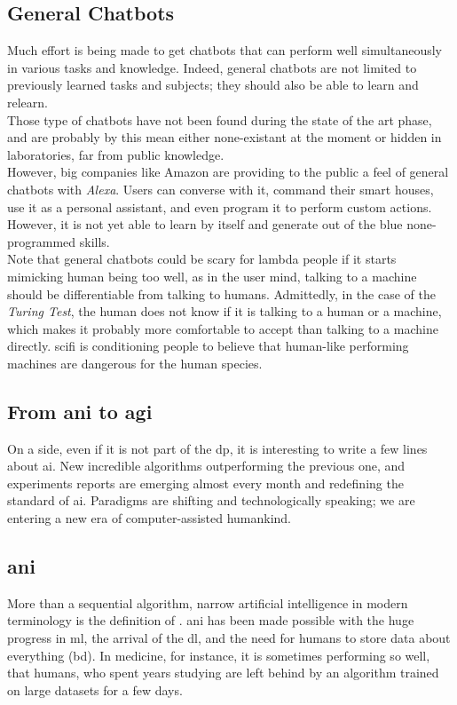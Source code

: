 \subsection{General Chatbots}
\label{sota:chatbots-general}
Much effort is being made to get chatbots that can perform well simultaneously in various tasks and knowledge. Indeed, general chatbots are not limited to previously learned tasks and subjects; they should also be able to learn and relearn.\\

Those type of chatbots have not been found during the state of the art phase, and are probably by this mean either none-existant at the moment or hidden in laboratories, far from public knowledge. \\

However, big companies like Amazon are providing to the public a feel of general chatbots with \textit{Alexa}\cite{chatbot:alexa}. Users can converse with it, command their smart houses, use it as a personal assistant, and even program it to perform custom actions. However, it is not yet able to learn by itself and generate out of the blue none-programmed skills.\\

Note that general chatbots could be scary for lambda people if it starts mimicking human being too well, as in the user mind, talking to a machine should be differentiable from talking to humans. Admittedly, in the case of the \textit{Turing Test}\cite{paper:turing}, the human does not know if it is talking to a human or a machine, which makes it probably more comfortable to accept than talking to a machine directly. \gls{scifi} is conditioning people to believe that human-like performing machines are dangerous for the human species.


\subsection{From \gls{ani} to \gls{agi}}
On a side, even if it is not part of the \gls{dp}, it is interesting to write a few lines about \gls{ai}. New incredible algorithms outperforming the previous one, and experiments reports are emerging almost every month and redefining the standard of \gls{ai}. Paradigms are shifting and technologically speaking; we are entering a new era of computer-assisted humankind.

\subsection{\gls{ani}}
More than a sequential algorithm, narrow artificial intelligence in modern terminology is the definition of . \gls{ani} has been made possible with the huge progress in \gls{ml}, the arrival of the \gls{dl}, and the need for humans to store data about everything (\gls{bd}). In medicine, for instance, it is sometimes performing so well, that humans, who spent years studying are left behind by an algorithm trained on large datasets for a few days.

